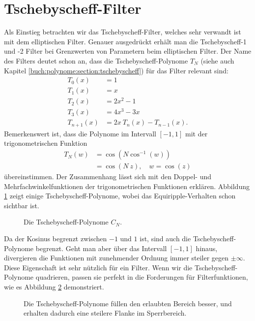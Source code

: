 \section{Tschebyscheff-Filter}

Als Einstieg betrachten wir das Tschebyscheff-Filter, welches sehr verwandt ist mit dem elliptischen Filter.
Genauer ausgedrückt erhält man die Tschebyscheff-1 und -2 Filter bei Grenzwerten von Parametern beim elliptischen Filter.
Der Name des Filters deutet schon an, dass die Tschebyscheff-Polynome $T_N$ (siehe auch Kapitel \ref{buch:polynome:section:tschebyscheff}) für das Filter relevant sind:
\begin{align}
    T_{0}(x)&=1\\
    T_{1}(x)&=x\\
    T_{2}(x)&=2x^{2}-1\\
    T_{3}(x)&=4x^{3}-3x\\
    T_{n+1}(x)&=2x~T_{n}(x)-T_{n-1}(x).
\end{align}
Bemerkenswert ist, dass die Polynome im Intervall $[-1, 1]$ mit der trigonometrischen Funktion
\begin{align} \label{ellfilter:eq:chebychef_polynomials}
    T_N(w) &= \cos \left( N \cos^{-1}(w) \right) \\
           &= \cos \left(N~z \right), \quad w= \cos(z)
\end{align}
übereinstimmen.
Der Zusammenhang lässt sich mit den Doppel- und Mehrfachwinkelfunktionen der trigonometrischen Funktionen erklären.
Abbildung \ref{ellfilter:fig:chebychef_polynomials} zeigt einige Tschebyscheff-Polynome, wobei das Equiripple-Verhalten schon sichtbar ist.
\begin{figure}
    \centering
    
    \caption{Die Tschebyscheff-Polynome $C_N$.}
    \label{ellfilter:fig:chebychef_polynomials}
\end{figure}
Da der Kosinus begrenzt zwischen $-1$ und $1$ ist, sind auch die Tschebyscheff-Polynome begrenzt.
Geht man aber über das Intervall $[-1, 1]$ hinaus, divergieren die Funktionen mit zunehmender Ordnung immer steiler gegen $\pm \infty$.
Diese Eigenschaft ist sehr nützlich für ein Filter.
Wenn wir die Tschebyscheff-Polynome quadrieren, passen sie perfekt in die Forderungen für Filterfunktionen, wie es Abbildung \ref{ellfiter:fig:chebychef} demonstriert.
\begin{figure}
    \centering
    
    \caption{Die Tschebyscheff-Polynome füllen den erlaubten Bereich besser, und erhalten dadurch eine steilere Flanke im Sperrbereich.}
    \label{ellfiter:fig:chebychef}
\end{figure}

